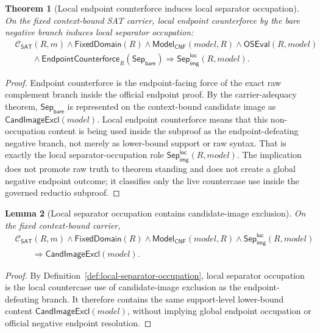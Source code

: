 \documentclass[11pt]{article}
\newtheorem{theorem}{Theorem}[section]
\newtheorem{lemma}[theorem]{Lemma}
\theoremstyle{definition}
\theoremstyle{remark}
\newcommand{\SepBare}{\mathsf{Sep}_{\mathsf{bare}}}
\newcommand{\LocalSepImgOcc}{\mathsf{Sep}_{\mathsf{img}}^{\mathsf{loc}}}
\newcommand{\ClayCtx}{\mathcal{C}_{\mathsf{SAT}}(R,m)}
\newcommand{\FixedDom}{\mathsf{FixedDomain}}
\newcommand{\ModelOfCnf}{\mathsf{Model}_{\mathsf{CNF}}}
\newcommand{\CandImageExcl}{\mathsf{CandImageExcl}}
\newcommand{\OfficialSATEval}{\mathsf{OSEval}}
\newcommand{\EndpointCounterforce}{\mathsf{EndpointCounterforce}}
\begin{document}
\begin{theorem}[Local endpoint counterforce induces local separator occupation]
\label{thm:local-counterforce-induces-local-separator-occupation}
On the fixed context-bound SAT carrier, local endpoint counterforce by the bare negative branch induces local separator occupation:
\[
\begin{aligned}
  &\ClayCtx\wedge\FixedDom(R)\wedge\ModelOfCnf(model,R)\wedge\OfficialSATEval(R,model)\\
  &\qquad\wedge\EndpointCounterforce_R(\SepBare)\Rightarrow \LocalSepImgOcc(R,model).
\end{aligned}
\]
\end{theorem}

\begin{proof}
Endpoint counterforce is the endpoint-facing force of the exact raw complement branch inside the official endpoint proof. By the carrier-adequacy theorem, \(\SepBare\) is represented on the context-bound candidate image as \(\CandImageExcl(model)\). Local endpoint counterforce means that this non-occupation content is being used inside the subproof as the endpoint-defeating negative branch, not merely as lower-bound support or raw syntax. That is exactly the local separator-occupation role \(\LocalSepImgOcc(R,model)\). The implication does not promote raw truth to theorem standing and does not create a global negative endpoint outcome; it classifies only the live countercase use inside the governed reductio subproof.
\end{proof}

\begin{lemma}[Local separator occupation contains candidate-image exclusion]
\label{lem:local-separator-occupation-contains-candidate-image-exclusion}
On the fixed context-bound carrier,
\[
\begin{aligned}
  &\ClayCtx\wedge\FixedDom(R)\wedge\ModelOfCnf(model,R)\wedge\LocalSepImgOcc(R,model)\\
  &\qquad\Rightarrow \CandImageExcl(model).
\end{aligned}
\]
\end{lemma}

\begin{proof}
By Definition~\ref{def:local-separator-occupation}, local separator occupation is the local countercase use of candidate-image exclusion as the endpoint-defeating branch. It therefore contains the same support-level lower-bound content \(\CandImageExcl(model)\), without implying global endpoint occupation or official negative endpoint resolution.
\end{proof}
\end{document}
